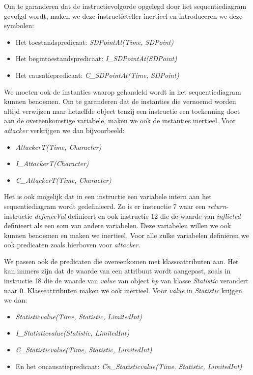 Om te garanderen dat de instructievolgorde opgelegd door het sequentiediagram gevolgd wordt, maken we deze instructieteller inertieel en introduceren we deze symbolen:

\begin{itemize}
	\item Het toestandspredicaat: \textit{SDPointAt(Time, SDPoint)}
	\item Het begintoestandspredicaat: \textit{I\_SDPointAt(SDPoint)}
	\item Het causatiepredicaat: \textit{C\_SDPointAt(Time, SDPoint)}
\end{itemize}

We moeten ook de instanties waarop gehandeld wordt in het sequentiediagram kunnen benoemen. Om te garanderen dat de instanties die vernoemd worden altijd verwijzen naar hetzelfde object tenzij een instructie een toekenning doet aan de overeenkomstige variabele, maken we ook de instanties inertieel. Voor \textit{attacker} verkrijgen we dan bijvoorbeeld:

\begin{itemize}
	\item \textit{AttackerT(Time, Character)}
	\item \textit{I\_AttackerT(Character)}
	\item \textit{C\_AttackerT(Time, Character)}
\end{itemize}

Het is ook mogelijk dat in een instructie een variabele intern aan het sequentiediagram wordt gedefinieerd. Zo is er instructie 7 waar een \textit{return}-instructie \textit{defenceVal} definieert en ook instructie 12 die de waarde van \textit{inflicted} definieert als een som van andere variabelen. Deze variabelen willen we ook kunnen benoemen en maken we inertieel. Voor alle zulke variabelen defini\"eren we ook predicaten zoals hierboven voor \textit{attacker}.

We passen ook de predicaten die overeenkomen met klasseattributen aan. Het kan immers zijn dat de waarde van een attribuut wordt aangepast, zoals in instructie 18 die de waarde van \textit{value} van object \textit{hp} van klasse \textit{Statistic} verandert naar 0. Klasseattributen maken we ook inertieel. Voor \textit{value} in \textit{Statistic} krijgen we dan:

\begin{itemize}
	\item \textit{Statisticvalue(Time, Statistic, LimitedInt)}
	\item \textit{I\_Statisticvalue(Statistic, LimitedInt)}
	\item \textit{C\_Statisticvalue(Time, Statistic, LimitedInt)}
	\item En het oncausatiepredicaat: \textit{Cn\_Statisticvalue(Time, Statistic, LimitedInt)}
\end{itemize}

